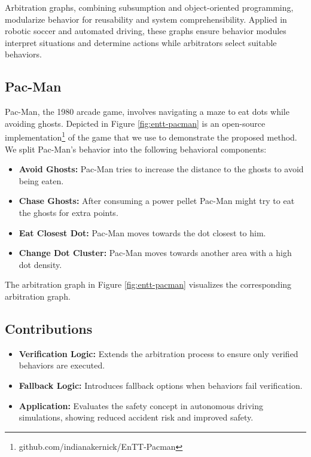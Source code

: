 Arbitration graphs, combining subsumption and object-oriented programming, modularize behavior for reusability and system comprehensibility. Applied in robotic soccer and automated driving, these graphs ensure behavior modules interpret situations and determine actions while arbitrators select suitable behaviors.

\subsection{Pac-Man}
Pac-Man, the 1980 arcade game, involves navigating a maze to eat dots while avoiding ghosts.
Depicted in Figure \ref{fig:entt-pacman} is an open-source implementation\footnote{github.com/indianakernick/EnTT-Pacman}  of the game that we use to demonstrate the proposed method.
We split Pac-Man's behavior into the following behavioral components:

\begin{itemize}
    \item \textbf{Avoid Ghosts:} Pac-Man tries to increase the distance to the ghosts to avoid being eaten.
    \item \textbf{Chase Ghosts:} After consuming a power pellet Pac-Man might try to eat the ghosts for extra points.
    \item \textbf{Eat Closest Dot:} Pac-Man moves towards the dot closest to him.
    \item \textbf{Change Dot Cluster:} Pac-Man moves towards another area with a high dot density.
\end{itemize}

The arbitration graph in Figure \ref{fig:entt-pacman} visualizes the corresponding arbitration graph.

\subsection{Contributions}

\begin{itemize}
\item \textbf{Verification Logic:} Extends the arbitration process to ensure only verified behaviors are executed.
\item \textbf{Fallback Logic:} Introduces fallback options when behaviors fail verification.
\item \textbf{Application:} Evaluates the safety concept in autonomous driving simulations, showing reduced accident risk and improved safety.
\end{itemize}
